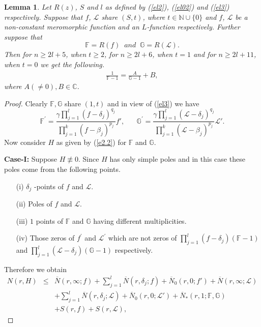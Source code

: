 \documentclass[a4paper,draft]{amsproc}
\theoremstyle{plain}
\newtheorem{lem}{Lemma}[section]
\theoremstyle{definition}
\theoremstyle{remark}
\newcommand{\ol}{\overline}
\newcommand{\be}{\begin{equation}}
\newcommand{\ee}{\end{equation}}
\newcommand{\beas}{\begin{eqnarray*}}
\newcommand{\eeas}{\end{eqnarray*}}
\newcommand{\bea}{\begin{eqnarray}}
\newcommand{\eea}{\end{eqnarray}}
\numberwithin{equation}{section}
\renewcommand{\leq}{\leqslant}\renewcommand{\geq}{\geqslant}
\begin{document}
\begin{lem}\label{l1.1}
Let $R(z)$, $S$ and $l$ as defined by (\ref{el2}), (\ref{el02}) and (\ref{el3}) respectively. Suppose that $f$, $\mathcal{L}$ share $(S,t)$, where  $t\in \mathbb{N}\cup\{0\}$ and $f$, $\mathcal{L}$ be a non-constant meromorphic function and an $L$-function respectively. Further suppose that \be\label{el05}\mathbb{F}= R(f)\;\; and\;\; \mathbb{G}=R(\mathcal{L}).\ee 
Then for $n\geq 2l+5$, when $t\geq2$, for $n\geq 2l+6$, when $t=1$ and for $n\geq 2l+11$, when $t=0$ we get the following.
\beas\frac{1}{\mathbb{F}-1}=\frac{A}{\mathbb{G}-1}+B,\eeas where $A(\neq0), B\in\mathbb{C}$.
\end{lem}
\begin{proof} 	
Clearly $\mathbb{F}, \mathbb{G}$ share $(1,t)$ and in view of (\ref{el3}) we have
\be \nonumber \mathbb{F}^{'}=\frac{\gamma\prod\limits_{j=1}^{l}(f-\delta_j)^{q_{j}}}{\prod\limits_{j=1}^{k}(f-\beta_j)^{p_{j}}}f',\;\;\;\;\;\;\mathbb{G}^{'}=\frac{\gamma\prod\limits_{j=1}^{l}(\mathcal{L}-\delta_j)^{q_{j}}}{\prod\limits_{j=1}^{k}(\mathcal{L}-\beta_j)^{p_{j}}}\mathcal{L}'.\ee %
Now consider $H$ as given by (\ref{e2.2}) for $\mathbb{F}$ and $\mathbb{G}$.
\vspace{0.1in}\par{\bf Case-I:} Suppose $H\not\equiv 0$. Since $H$ has only simple poles and in this case these poles come  from  the following points.
\begin{enumerate}
\item[(i)] $\delta_{j}$ -points of $f$ and $\mathcal{L}$.
\item[(ii)] Poles of $f$ and $\mathcal{L}$.
\item[(iii)] $1$ points of $\mathbb{F}$ and $\mathbb{G}$ having different multiplicities.
\item[(iv)] Those zeros of $f^{'}$ and $\mathcal{L^{'}}$ which are not zeros of   $\prod\limits_{j=1}^{l}(f-\delta_{j})(\mathbb{F}-1)$ and $\prod\limits_{j=1}^{l}(\mathcal{L}-\delta_{j})(\mathbb{G}-1)$ respectively.
\end{enumerate}
Therefore we obtain 
\bea\label{ep2} N(r,H) &\leq& \ol{N}(r,\infty;f)+\sum_{j=1}^{l}\ol{N}(r,\delta_j;f)+\ol N_0(r,0;f') +\ol{N}(r,\infty;\mathcal{L})\\\nonumber&&+\sum_{j=1}^{l}\ol{N}(r,\delta_j;\mathcal{L})+\ol N_0(r,0;\mathcal{L}')+\ol N_*(r,1;\mathbb{F},\mathbb{G})\\\nonumber&&+S(r,f)+S(r,\mathcal{L}),\eea

\end{proof}
\end{document}
